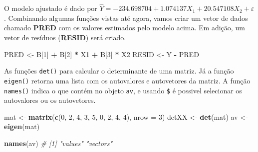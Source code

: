 \documentclass[
]{book}
\newenvironment{Shaded}{\begin{snugshade}}{\end{snugshade}}
\newcommand{\CommentTok}[1]{\textcolor[rgb]{0.56,0.35,0.01}{\textit{#1}}}
\newcommand{\DataTypeTok}[1]{\textcolor[rgb]{0.13,0.29,0.53}{#1}}
\newcommand{\DecValTok}[1]{\textcolor[rgb]{0.00,0.00,0.81}{#1}}
\newcommand{\KeywordTok}[1]{\textcolor[rgb]{0.13,0.29,0.53}{\textbf{#1}}}
\newcommand{\NormalTok}[1]{#1}
\newcommand{\OperatorTok}[1]{\textcolor[rgb]{0.81,0.36,0.00}{\textbf{#1}}}
\newcommand{\StringTok}[1]{\textcolor[rgb]{0.31,0.60,0.02}{#1}}
\begin{document}
O modelo ajustado é dado por \(\hat Y = - 234.698704 + 1.074137{X_1} + 20.547108{X_2} + \varepsilon\). Combinando algumas funções vistas até agora, vamos criar um vetor de dados chamado \textbf{PRED} com os valores estimados pelo modelo acima. Em adição, um vetor de resíduos (\textbf{RESID}) será criado.

\begin{Shaded}
\begin{Highlighting}[]
\NormalTok{PRED <-}\StringTok{ }\NormalTok{B[}\DecValTok{1}\NormalTok{] }\OperatorTok{+}\StringTok{ }\NormalTok{B[}\DecValTok{2}\NormalTok{] }\OperatorTok{*}\StringTok{ }\NormalTok{X1 }\OperatorTok{+}\StringTok{ }\NormalTok{B[}\DecValTok{3}\NormalTok{] }\OperatorTok{*}\StringTok{ }\NormalTok{X2}
\NormalTok{RESID <-}\StringTok{ }\NormalTok{Y }\OperatorTok{-}\StringTok{ }\NormalTok{PRED}
\end{Highlighting}
\end{Shaded}

As funções \texttt{det()}  para calcular o determinante de uma matriz. Já a função \texttt{eigen()}  retorna uma lista com os autovalores e autovetores da matriz. A função \texttt{names()}  indica o que contém no objeto \texttt{av}, e usando \texttt{\$} é possivel selecionar os autovalores ou os autovetores.

\begin{Shaded}
\begin{Highlighting}[]
\NormalTok{mat <-}\StringTok{ }\KeywordTok{matrix}\NormalTok{(}\KeywordTok{c}\NormalTok{(}\DecValTok{0}\NormalTok{, }\DecValTok{2}\NormalTok{, }\DecValTok{4}\NormalTok{, }\DecValTok{3}\NormalTok{, }\DecValTok{5}\NormalTok{, }\DecValTok{0}\NormalTok{, }\DecValTok{2}\NormalTok{, }\DecValTok{4}\NormalTok{, }\DecValTok{4}\NormalTok{), }\DataTypeTok{nrow =} \DecValTok{3}\NormalTok{)}
\NormalTok{detXX <-}\StringTok{ }\KeywordTok{det}\NormalTok{(mat)}
\NormalTok{av <-}\StringTok{ }\KeywordTok{eigen}\NormalTok{(mat)}
\end{Highlighting}
\end{Shaded}

\begin{Shaded}
\begin{Highlighting}[]
\KeywordTok{names}\NormalTok{(av)}
\CommentTok{# [1] "values"  "vectors"}
\end{Highlighting}
\end{Shaded}

\begin{Shaded}
\end{Shaded}
\end{document}
